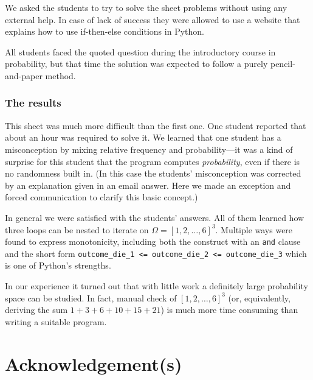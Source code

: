 \documentclass[]{interact}
\theoremstyle{plain}%
\theoremstyle{definition}
\theoremstyle{remark}
\begin{document}
We asked the students to try to solve the sheet problems without using any external help.
In case of lack of success
they were allowed to use a website that explains how to use if-then-else conditions in Python.

All students faced the quoted question during the introductory course in probability, but that time the solution
was expected to follow a purely pencil-and-paper method.

\subsubsection*{The results}

This sheet was much more difficult than the first one. One student reported that about an hour was required to solve it.
We learned that one student has a misconception by mixing relative frequency and probability---it was
a kind of surprise for this student that the program computes \textit{probability}, even if
there is no randomness built in. (In this case the students' misconception was corrected
by an explanation given in an email answer. Here we made an exception and forced
communication to clarify this basic concept.)

In general we were satisfied with the students' answers. All of them learned how three loops can
be nested to iterate on $\Omega=[1,2,\ldots,6]^3$. Multiple ways were found to express monotonicity,
including both the construct with an \texttt{and} clause and the short form
\texttt{outcome_die_1 <= outcome_die_2 <= outcome_die_3} which is one of Python's strengths.

In our experience it turned out that with little work a definitely large probability space
can be studied. In fact, manual check of $[1,2,\ldots,6]^3$ (or, equivalently, deriving the sum
$1+3+6+10+15+21$) is much more time consuming than writing a suitable program.

\section*{Acknowledgement(s)}

\begin{thebibliography}{99}


\end{thebibliography}
\end{document}

